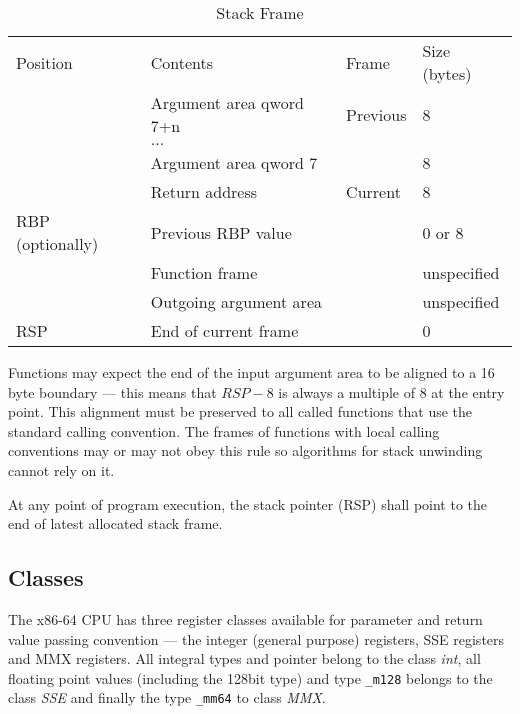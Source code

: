 \begin{table}
\caption{Stack Frame}
\label{tab-stack-frame}
\begin{center}
\begin{tabular}{l|l|l|l}
\hline\noalign{\smallskip}
Position & Contents & Frame & Size (bytes) \\
\noalign{\smallskip}\hline\noalign{\smallskip}
& Argument area qword 7+n & Previous & 8 \\
& $...$ & & \\
& Argument area qword 7 & & 8 \\
\hline
& Return address & Current & 8\\
RBP (optionally) & Previous RBP value & & 0 or 8\\
& Function frame & & unspecified\\
& Outgoing argument area & & unspecified\\
RSP & End of current frame & & 0\\
\hline
\end{tabular}
\end{center}
\end{table}

Functions may expect the end of the input argument area to be aligned
to a 16 byte boundary --- this means that $RSP - 8$ is always a
multiple of 8 at the entry point. This alignment must be preserved to
all called functions that use the standard calling convention. The
frames of functions with local calling conventions may or may not obey
this rule so algorithms for stack unwinding cannot rely on it.

At any point of program execution, the stack pointer (RSP) shall point to
the end of latest allocated stack frame.

\subsection{Classes}

The x86-64 CPU has three register classes available for parameter and
return value passing convention --- the integer (general purpose)
registers, SSE registers and MMX registers.  All integral types and
pointer belong to the class \emph{int}, all floating point values
(including the 128bit type) and type \verb|_m128| belongs to the class
\emph{SSE} and finally the type \verb|_mm64| to class \emph{MMX}.

